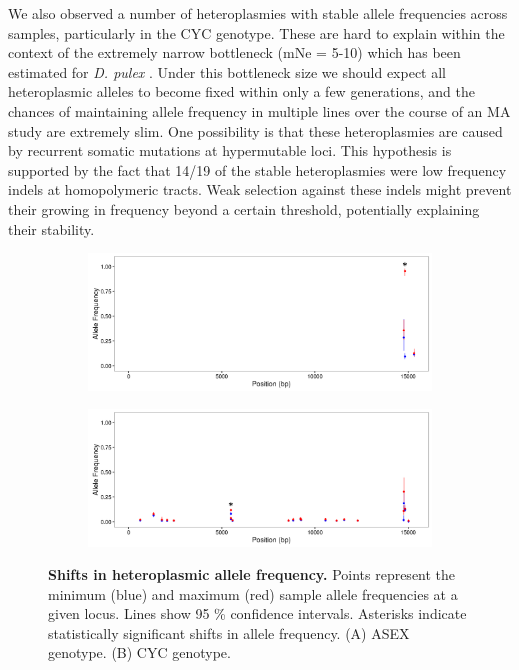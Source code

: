 \documentclass[12pt,twoside]{reedthesis}
\begin{document}
We also observed a number of heteroplasmies with stable allele frequencies across samples, particularly in the \gls{CYC} genotype.
These are hard to explain within the context of the extremely narrow bottleneck (\gls{mNe} = 5-10) which has been estimated for \textit{D. pulex} \citep{xu_high_2012}.
Under this bottleneck size we should expect all heteroplasmic alleles to become fixed within only a few generations, and the chances of maintaining allele frequency in multiple lines over the course of an \gls{MA} study are extremely slim.
One possibility is that these heteroplasmies are caused by recurrent somatic mutations at hypermutable loci.
This hypothesis is supported by the fact that 14/19 of the stable heteroplasmies were low frequency indels at homopolymeric tracts.
Weak selection against these indels might prevent their growing in frequency beyond a certain threshold, potentially explaining their stability.

\begin{figure}[h!]
     \begin{center}
     \begin{subfigure}[t]{1\textwidth}
        \centering
        \includegraphics[width=1\textwidth]{../figures/lin_all_shift.jpeg}
        \label{all_shift_asex}
    \end{subfigure}%
    \newline
    \begin{subfigure}[t]{1\textwidth}
        \centering
        \includegraphics[width=1\textwidth]{../figures/tco_all_shift.jpeg}
        \label{all_shift_cyc}
    \end{subfigure}
    \caption[Shifts in heteroplasmic allele frequency]{\textbf{Shifts in heteroplasmic allele frequency.} Points represent the minimum (blue) and maximum (red) sample allele frequencies at a given locus. Lines show 95 \% confidence intervals. Asterisks indicate statistically significant shifts in allele frequency. (A) ASEX genotype. (B) CYC genotype.}
    \label{all_shift}
    \end{center}
\end{figure}
\end{document}
